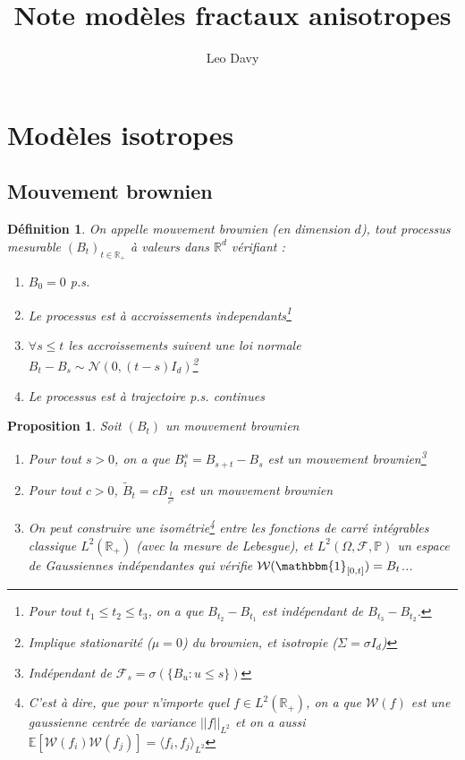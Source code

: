 \documentclass[11pt]{article} %
\title{Note modèles fractaux anisotropes}
\author{Leo Davy}
\newtheorem{definition}{Définition}[section]
\newtheorem{proposition}{Proposition}[section]
\begin{document}
\maketitle
\section{Modèles isotropes}
\subsection{Mouvement brownien}
\begin{definition}
	On appelle mouvement brownien (en dimension $d$), tout processus mesurable $(B_t)_{t\in\mathbb{R}_+}$ à valeurs dans $\mathbb{R}^d$ vérifiant :
	\begin{enumerate}
		\item $B_0 = 0$ p.s.
		\item Le processus est à accroissements independants\footnote{Pour tout $t_1\leq t_2 \leq t_3$, on a que $B_{t_2} - B_{t_1}$ est indépendant de $B_{t_3} - B_{t_2}$.}
		\item $\forall s \leq t$ les accroissements suivent une loi normale $B_t - B_s \sim \mathcal{N}(0, (t-s)I_d)$\footnote{Implique stationarité ($\mu = 0$) du brownien, et isotropie ($\Sigma = \sigma I_d$)}
		\item Le processus est à trajectoire p.s. continues
	\end{enumerate}
\end{definition}
\begin{proposition}
	Soit $(B_t)$ un mouvement brownien
	\begin{enumerate}
		\item Pour tout $s>0$, on a que $B_t^s = B_{s+t} - B_s$ est un mouvement brownien\footnote{Indépendant de $\mathcal{F}_s = \sigma(\{B_u : u\leq s\})$}
		\item Pour tout $c>0$, $\tilde B_t = cB_{\frac{t}{c^2}}$ est un mouvement brownien
		\item On peut construire une isométrie\footnote{C'est à dire, que pour n'importe quel $f\in L^2(\mathbb{R}_+)$, on a que $\mathcal{W}(f)$ est une gaussienne centrée de variance $||f||_{L^2}$ et on a aussi $\mathbb{E}[\mathcal{W}(f_i)\mathcal{W}(f_j)] = \langle f_i, f_j\rangle_{L^2}$} entre les fonctions de carré intégrables classique $L^2(\mathbb{R}_+)$ (avec la mesure de Lebesgue), et $L^2(\Omega, \mathcal{F}, \mathbb{P})$ un espace de Gaussiennes indépendantes qui vérifie $\mathcal{W}(\mathbbm{1}_{[0,t]}) = B_t$...
	\end{enumerate}
\end{proposition}
\end{document}
